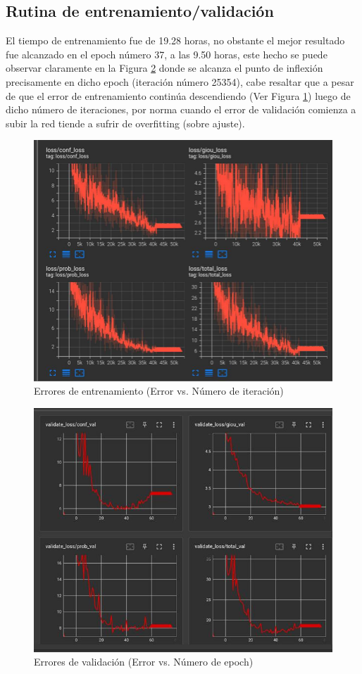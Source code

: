\subsection{Rutina de entrenamiento/validación}
El tiempo de entrenamiento fue de 19.28 horas, no obstante el mejor resultado fue alcanzado en el epoch número 37, a las 9.50 horas, este hecho se puede observar claramente en la Figura \ref{validation_result} donde se alcanza el punto de inflexión precisamente en dicho epoch (iteración número 25354), cabe resaltar que a pesar de que el error de entrenamiento continúa descendiendo (Ver Figura \ref{training_result}) luego de dicho número de iteraciones, por norma cuando el error de validación comienza a subir la red tiende a sufrir de overfitting (sobre ajuste).
\begin{figure}[H]
    \centering
    \includegraphics[scale=0.4]{Recursos/training_loss_result.jpg}
    \caption{Errores de entrenamiento (Error vs. Número de iteración)}
    \label{training_result}
\end{figure}
\begin{figure}[H]
    \centering
    \includegraphics[scale=0.6]{Recursos/validation_loss_result.jpg}
    \caption{Errores de validación (Error vs. Número de epoch)}
    \label{validation_result}
\end{figure}
